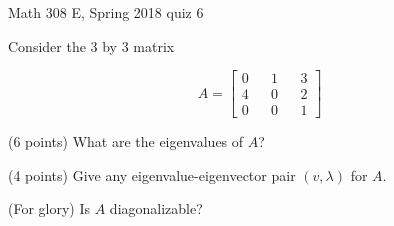 \documentclass{exam}
\begin{document}
 
\begin{center} \begin{Large} Math 308 E, Spring 2018 quiz 6 \end{Large}
\end{center} 

\vspace{5mm}

\begin{center}
\end{center}

\vspace{1cm}
 

\vspace{1cm}

Consider the 3 by 3 matrix 

\[
A = \begin{bmatrix} 0 && 1 && 3 \\ 4 && 0 && 2 \\ 0 && 0 && 1 \end{bmatrix}
\]

\begin{questions}
\question (6 points) What are the eigenvalues of $A$?

\vfill

\question (4 points) Give any eigenvalue-eigenvector pair $(v, \lambda)$ for $A$. 

\vfill 

\question(For glory) Is $A$ diagonalizable? 

\vfill

\end{questions}
\end{document}

